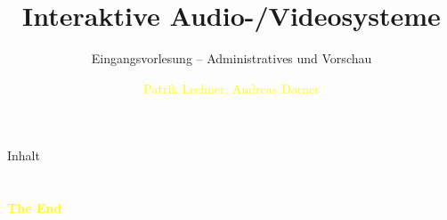 \documentclass[aspectratio=43]{beamer}
\title{Interaktive Audio-/Videosysteme} %
\subtitle{Eingangsvorlesung -- Administratives und Vorschau}
\author[Lechner/Dorner]{\textcolor{yellow}{Patrik Lechner, Andreas Dorner}}
\institute[IC\textbackslash M/T]{
    \\%
    \textcolor{white}{FH St.Pölten}%
} %
\begin{document}
    
    \frame{\titlepage}
    
    \begin{frame}{Inhalt}
        \tableofcontents
    \end{frame}
        
    
    
    
    
    
    
    
    
    

    \section{}
    \begin{frame}{}
        \centering
            \Huge\bfseries
        \textcolor{yellow}{The End}
    \end{frame}
\end{document}
